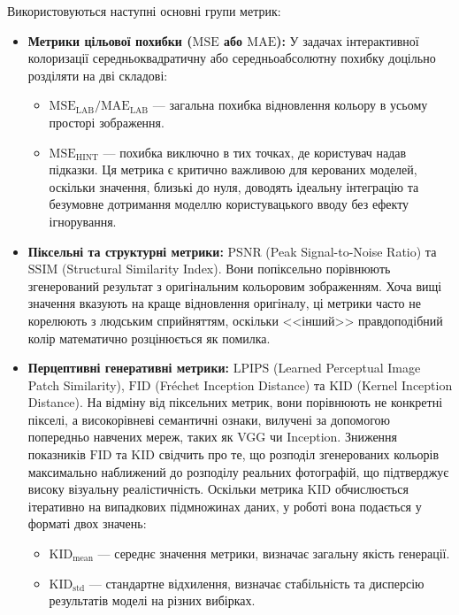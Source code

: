         Використовуються наступні основні групи метрик:
        \begin{itemize}[label=$\bullet$]
            \item \textbf{Метрики цільової похибки ($\mathrm{MSE}$ або $\mathrm{MAE}$):} У задачах інтерактивної колоризації середньоквадратичну або середньоабсолютну похибку доцільно розділяти на дві складові:
                \begin{itemize}[label=$\square$]
                    \item $\mathrm{MSE}_{\mathrm{LAB}} / \mathrm{MAE}_{\mathrm{LAB}}$ --- загальна похибка відновлення кольору в усьому просторі зображення.
                    \item $\mathrm{MSE}_{\mathrm{HINT}}$ --- похибка виключно в тих точках, де користувач надав підказки. Ця метрика є критично важливою для керованих моделей, оскільки значення, близькі до нуля, доводять ідеальну інтеграцію та безумовне дотримання моделлю користувацького вводу без ефекту ігнорування.
                \end{itemize}

            \item \textbf{Піксельні та структурні метрики:} $\mathrm{PSNR}$ (Peak Signal-to-Noise Ratio) та $\mathrm{SSIM}$ (Structural Similarity Index). Вони попіксельно порівнюють згенерований результат з оригінальним кольоровим зображенням.
                Хоча вищі значення вказують на краще відновлення оригіналу, ці метрики часто не корелюють з людським сприйняттям, оскільки <<інший>> правдоподібний колір математично розцінюється як помилка.

            \item \textbf{Перцептивні генеративні метрики:} $\mathrm{LPIPS}$ (Learned Perceptual Image Patch Similarity), $\mathrm{FID}$ (Fréchet Inception Distance) та $\mathrm{KID}$ (Kernel Inception Distance). 
                На відміну від піксельних метрик, вони порівнюють не конкретні пікселі, а високорівневі семантичні ознаки, вилучені за допомогою попередньо навчених мереж, таких як VGG чи Inception.
                Зниження показників $\mathrm{FID}$ та $\mathrm{KID}$ свідчить про те, що розподіл згенерованих кольорів максимально наближений до розподілу реальних фотографій, що підтверджує високу візуальну реалістичність.
                Оскільки метрика $\mathrm{KID}$ обчислюється ітеративно на випадкових підмножинах даних, у роботі вона подається у форматі двох значень:
                \begin{itemize}[label=$\square$]
                    \item $\mathrm{KID}_{\mathrm{mean}}$ --- середнє значення метрики, визначає загальну якість генерації.
                    \item $\mathrm{KID}_{\mathrm{std}}$ --- стандартне відхилення, визначає стабільність та дисперсію результатів моделі на різних вибірках.
                \end{itemize}


\end{itemize}
